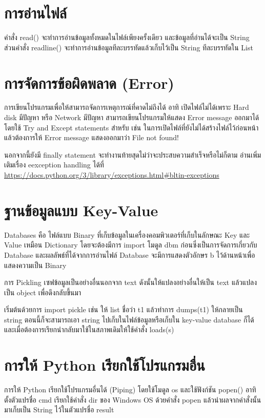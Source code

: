 \section{การอ่านไฟล์}

คำสั่ง read() จะทำการอ่านข้อมูลทั้งหมดในไฟล์เพียงครั้งเดียว และข้อมูลที่อ่านได้จะเป็น String ส่วนคำสั่ง readline() จะทำการอ่านข้อมูลทีละบรรทัดแล้วเก็บไว้เป็น String ทีละบรรทัดใน List

\section{การจัดการข้อผิดพลาด (Error)}

การเขียนโปรแกรมเพื่อให้สามารถจัดการเหตุการณ์ที่คาดไม่ถึงได้ อาทิ เปิดไฟล์ไม่ได้เพราะ Hard disk มีปัญหา หรือ Network มีปัญหา สามารถเขียนโปรแกรมให้แสดง Error message ออกมาได้ โดยใช้ Try and Except statements สำหรับ  เช่น ในการเปิดไฟล์ที่ยังไม่ได้สร้างไฟล์ไว้ก่อนหน้า แล้วต้องการให้ Error message แสดงออกมาว่า  File not found!

นอกจากนี้ยังมี finally statement จะทำงานท้ายสุดไม่ว่าจะประสบความสำเร็จหรือไม่ก็ตาม อ่านเพิ่มเติมเรื่อง eexception handling ได้ที่ \url{https://docs.python.org/3/library/exceptions.html\#bltin-exceptions}

\section{ฐานข้อมูลแบบ Key-Value}

Databases คือ ไฟล์แบบ Binary ที่เก็บข้อมูลในเครื่องคอมพิวเตอร์ที่เก็บในลักษณะ Key และ Value เหมือน Dictionary โดยจะต้องมีการ import โมดูล dbm ก่อนซึ่งเป็นการจัดการเกี่ยวกับ Database และผลลัพธ์ที่ได้จากการอ่านไฟล์ Database จะมีการแสดงตัวอักษร b ไว้ด้านหน้าเพื่อแสดงความเป็น Binary

การ Pickling เซฟข้อมูลเป็นอย่างอื่นนอกจาก text ดังนั้นให้แปลงอย่างอื่นให้เป็น text แล้วแปลงเป็น object เพื่อดึงกลับขึ้นมา

เริ่มต้นด้วยการ import pickle เช่น ให้ list ชื่อว่า t1 แล้วทำการ dumps(t1) ให้กลายเป็น string ตอนนี้ก็จะสามารถเอา string ไปเก็บในไฟล์ข้อมูลหรือเก็บใน key-value database ก็ได้ และเมื่อต้องการเรียกนำกลับมาใช้ในสภาพเดิมให้ใช้คำสั่ง loads(s) 

\section{การให้ Python เรียกใช้โปรแกรมอื่น}

การให้ Python เรียกใช้โปรแกรมอื่นได้ (Piping) โดยใช้โมดูล os และใช้ฟังก์ชัน popen()  อาทิ ตั้งตัวแปรชื่อ cmd เรียกใช้คำสั่ง dir ของ Windows OS ด้วยคำสั่ง popen แล้วนำผลจากคำสั่งนั้นมาเก็บเป็น String ไว้ในตัวแปรชื่อ result 

